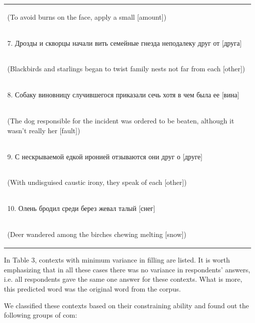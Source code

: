\documentclass[a4paper]{article}
\begin{document}
\begin{table}
\begin{tabular}{l}
\begin{english} (To avoid burns on the face, apply a small [amount])\end{english} \\
\begin{russian} 7. Дрозды и скворцы начали вить семейные гнезда неподалеку друг от [друга]\end{russian} \\
\begin{english} (Blackbirds and starlings began to twist family nests not far from each [other])\end{english} \\
\begin{russian} 8. Собаку виновницу случившегося приказали сечь хотя в чем была ее [вина]\end{russian} \\
\begin{english} (The dog responsible for the incident was ordered to be beaten, although it wasn't really her [fault])\end{english} \\
\begin{russian} 9. С нескрываемой едкой иронией отзываются они друг о [друге]\end{russian} \\
\begin{english} (With undisguised caustic irony, they speak of each [other])\end{english} \\
\begin{russian} 10. Олень бродил среди берез жевал талый [снег]\end{russian} \\
\begin{english} (Deer wandered among the birches chewing melting [snow])\end{english} \\
\end{tabular}
\end{table}

In Table 3, contexts with minimum variance in filling
are listed. It is worth emphasizing that in all these cases there was no variance in respondents’ answers, i.e. all respondents gave the same one answer for these contexts. What is more, this predicted word was the original word from the corpus.

We classified these contexts based on their constraining ability and found out the following groups of com:
\newline
\end{document}
